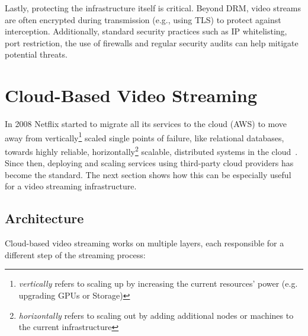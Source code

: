 Lastly, protecting the infrastructure itself is critical. Beyond DRM, video streams are often encrypted during transmission (e.g., using \ac{TLS}) to protect against interception. Additionally, standard security practices such as IP whitelisting, port restriction, the use of firewalls and regular security audits can help mitigate potential threats.

\section{Cloud-Based Video Streaming}

In 2008 Netflix started to migrate all its services to the cloud (\ac{AWS}) to move away from vertically\footnote{\textit{vertically} refers to scaling up by increasing the current resources' power (e.g. upgrading GPUs or Storage)} scaled single points of failure, like relational databases, towards highly reliable, horizontally\footnote{\textit{horizontally} refers to scaling out by adding additional nodes or machines to the current infrastructure} scalable, distributed systems in the cloud~\parencite{netflix_aws}. Since then, deploying and scaling services using third-party cloud providers has become the standard. The next section shows how this can be especially useful for a video streaming infrastructure. 

\subsection{Architecture}
Cloud-based video streaming works on multiple layers, each responsible for a different step of the streaming process:

